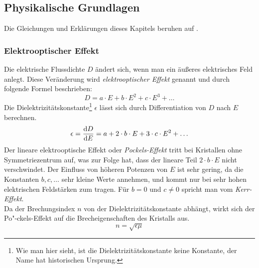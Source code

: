 \subsection{Physikalische Grundlagen}
Die Gleichungen und Erklärungen dieses Kapitels beruhen auf \cite{herrmann}.
\subsubsection{Elektrooptischer Effekt}
Die elektrische Flussdichte $D$ ändert sich, wenn man ein äußeres elektrisches Feld anlegt. Diese Veränderung wird 
\emph{elektrooptischer Effekt} genannt und durch folgende Formel beschrieben:
\begin{equation}
\label{eq:eoeff}
  D = a \cdot E + b \cdot E^2 + c \cdot E^3 + \ldots
\end{equation}
Die Dielektrizitätskonstante\footnote{Wie man hier sieht, ist die Dielektrizitätskonstante keine Konstante, der Name hat historischen Ursprung.} 
$\epsilon$ lässt sich durch Differentiation von $D$ nach $E$ berechnen.
\begin{equation}
\label{eq:dielconst}
  \epsilon = \frac{\mathrm{d} D}{\mathrm{d} E} = a + 2 \cdot b \cdot E + 3 \cdot c \cdot E^2 + \ldots
\end{equation}
Der lineare elektrooptische Effekt oder \emph{Pockels-Effekt} tritt bei Kristallen ohne Symmetriezentrum auf, was zur Folge hat, dass 
der lineare Teil $2 \cdot b \cdot E$ nicht verschwindet. Der Einfluss von höheren Potenzen von $E$ ist sehr gering, da die Konstanten 
$b, c, \ldots$ sehr kleine Werte annehmen, und kommt nur bei sehr hohen elektrischen Feldstärken zum tragen. 
Für $b = 0$ und $c \neq 0$ spricht man vom \emph{Kerr-Effekt}. \\
Da der Brechungsindex $n$ von der Dielektrizitätskonstante abhängt, wirkt sich der Po"-ckels-Effekt auf die Brecheigenschaften des Kristalls aus.
\begin{equation}
  n = \sqrt{\epsilon \mu}
\end{equation}

